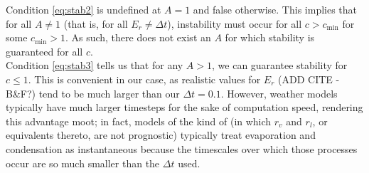 \documentclass[11pt]{article}
\begin{document}
Condition \ref{eq:stab2} is undefined at $A=1$ and false otherwise. This implies that for all $A\neq 1$ (that is, for all $E_r\neq\Delta t$), instability must occur for all $c>c_{\text{min}}$ for some $c_{\text{min}}>1$. As such, there does not exist an $A$ for which stability is guaranteed for all $c$. \\
Condition \ref{eq:stab3} tells us that for any $A>1$, we can guarantee stability for $c\leq 1$. This is convenient in our case, as realistic values for $E_r$ (ADD CITE - B\&F?) tend to be much larger than our $\Delta t=0.1$. However, weather models typically have much larger timesteps for the sake of computation speed, rendering this advantage moot; in fact, models of the kind of \citet{Smith1990} (in which $r_v$ and $r_l$, or equivalents thereto, are not prognostic) typically treat evaporation and condensation as instantaneous because the timescales over which those processes occur are so much smaller than the $\Delta t$ used.\\

\newpage


\end{document}
